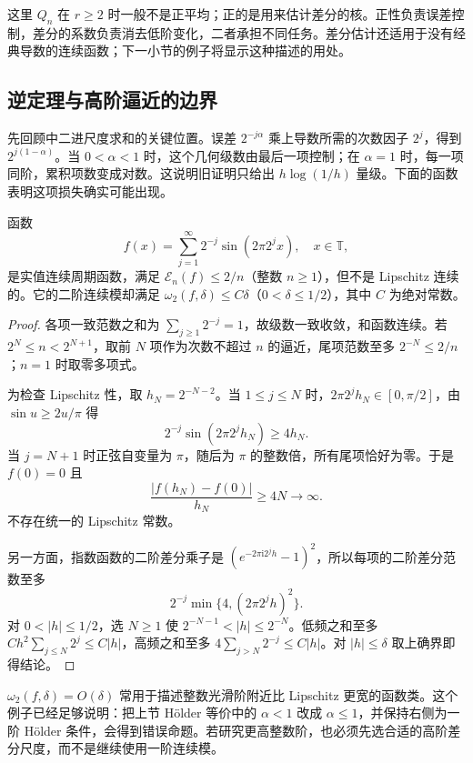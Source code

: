 这里 \(Q_n\) 在 \(r\geq2\) 时一般不是正平均；正的是用来估计差分的核。正性负责误差控制，差分的系数负责消去低阶变化，二者承担不同任务。差分估计还适用于没有经典导数的连续函数；下一小节的例子将显示这种描述的用处。

\subsection{逆定理与高阶逼近的边界}
\label{b2:subsec:020904}

先回顾中二进尺度求和的关键位置。误差 \(2^{-j\alpha}\) 乘上导数所需的次数因子 \(2^j\)，得到 \(2^{j(1-\alpha)}\)。当 \(0<\alpha<1\) 时，这个几何级数由最后一项控制；在 \(\alpha=1\) 时，每一项同阶，累积项数变成对数。这说明旧证明只给出 \(h\log(1/h)\) 量级。下面的函数表明这项损失确实可能出现。

\begin{proposition}\label{b2:prop:approximation-integer-counterexample}
函数
\[
 f(x)=\sum_{j=1}^{\infty}2^{-j}\sin(2\pi 2^j x),\quad x\in\mathbb T,
\]
是实值连续周期函数，满足 \(\mathcal E_n(f)\leq2/n\)（整数 \(n\geq1\)），但不是 Lipschitz 连续的。它的二阶连续模却满足 \(\omega_2(f,\delta)\leq C\delta\)（\(0<\delta\leq1/2\)），其中 \(C\) 为绝对常数。
\end{proposition}
\begin{proof}
各项一致范数之和为 \(\sum_{j\geq1}2^{-j}=1\)，故级数一致收敛，和函数连续。若 \(2^N\leq n<2^{N+1}\)，取前 \(N\) 项作为次数不超过 \(n\) 的逼近，尾项范数至多 \(2^{-N}\leq2/n\)；\(n=1\) 时取零多项式。

为检查 Lipschitz 性，取 \(h_N=2^{-N-2}\)。当 \(1\leq j\leq N\) 时，\(2\pi2^jh_N\in[0,\pi/2]\)，由 \(\sin u\geq2u/\pi\) 得
\[
 2^{-j}\sin(2\pi2^jh_N)\geq4h_N.
\]
当 \(j=N+1\) 时正弦自变量为 \(\pi\)，随后为 \(\pi\) 的整数倍，所有尾项恰好为零。于是 \(f(0)=0\) 且
\[
 \frac{|f(h_N)-f(0)|}{h_N}\geq4N\longrightarrow\infty.
\]
不存在统一的 Lipschitz 常数。

另一方面，指数函数的二阶差分乘子是 \((e^{-2\pi\mathrm i 2^jh}-1)^2\)，所以每项的二阶差分范数至多
\[
 2^{-j}\min\{4,(2\pi2^j h)^2\}.
\]
对 \(0<|h|\leq1/2\)，选 \(N\geq1\) 使 \(2^{-N-1}<|h|\leq2^{-N}\)。低频之和至多 \(C h^2\sum_{j\leq N}2^j\leq C|h|\)，高频之和至多 \(4\sum_{j>N}2^{-j}\leq C|h|\)。对 \(|h|\leq\delta\) 取上确界即得结论。
\end{proof}

\(\omega_2(f,\delta)=O(\delta)\) 常用于描述整数光滑阶附近比 Lipschitz 更宽的函数类。这个例子已经足够说明：把上节 Hölder 等价中的 \(\alpha<1\) 改成 \(\alpha\leq1\)，并保持右侧为一阶 Hölder 条件，会得到错误命题。若研究更高整数阶，也必须先选合适的高阶差分尺度，而不是继续使用一阶连续模。

